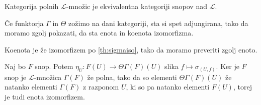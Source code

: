 \begin{izrek}
  Kategorija polnih \(ℒ\)-množic je ekvivalentna kategoriji snopov nad \(ℒ\).
\end{izrek}
\begin{dokaz}
  Če funktorja \(Γ\) in \(Θ\) zožimo na dani kategoriji, sta si spet
  adjungirana, tako da moramo zgolj pokazati, da sta enota in koenota
  izomorfizma.

  Koenota je že izomorfizem po \ref{th:sigmaiso}, tako da moramo preveriti zgolj
  enoto.

  Naj bo \(F\) snop. Potem \(η_U : F(U) → ΘΓ(F)(U)\) slika \(f ↦ σ_{(U,f)}\).
  Ker je \(F\) snop je \(ℒ\)-množica \(Γ(F)\) že polna, tako da so elementi
  \(ΘΓ(F)(U)\) že natanko elementi \(Γ(F)\) z razponom \(U\), ki so pa natanko
  elementi \(F(U)\), torej je tudi enota izomorfizem.
\end{dokaz}

